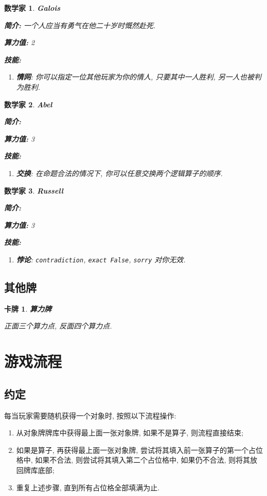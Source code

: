 \documentclass[UTF8]{ctexart}
\DeclareMathOperator{\0}{\mathbf{0}}                    %
\newcommand{\<}{\langle}
\renewcommand{\>}{\rangle}                              %
\newenvironment{xmp_box}{
    \begin{tcolorbox}[enhanced, colback=xmp_purple2, boxrule=0pt, frame hidden,
        borderline west={0.7mm}{0.1mm}{xmp_purple1},breakable]
    }
    {\end{tcolorbox}}
\newenvironment{cxmp_box}{
    \begin{tcolorbox}[enhanced, colback=cxmp_red2, boxrule=0pt, frame hidden,
        borderline west={0.7mm}{0.1mm}{cxmp_red1},breakable]
    }
    {\end{tcolorbox}}
\theoremstyle{MyStyle} %
\newtheorem{example}[definition]{卡牌}
\newenvironment{crd}[1]
{
    \begin{xmp_box}
        \begin{example}
            \textbf{#1}
            \newline
}
{
        \end{example}
    \end{xmp_box}
}
\newtheorem{mathematician}{数学家}
\newenvironment{hero}[3]
{
    \begin{cxmp_box}
        \begin{mathematician}
            \textbf{#1}

            \textbf{简介: }#2
            
            \textbf{算力值: }#3

            \textbf{技能: }
}
{
        \end{mathematician}
    \end{cxmp_box}
}
\newcommand*{\lean}[1]{\texttt{\color{blue}#1}}
\begin{document}
        \begin{hero}
            {Galois}
            {一个人应当有勇气在他二十岁时慨然赴死. }
            {2}
            \begin{enumerate}
                \item \textbf{情网}: 你可以指定一位其他玩家为你的情人, 只要其中一人胜利, 另一人也被判为胜利. 
            \end{enumerate}
        \end{hero}

        \begin{hero}
            {Abel}
            {}
            {3}
            \begin{enumerate}
                \item \textbf{交换}: 在命题合法的情况下, 你可以任意交换两个逻辑算子的顺序. 
            \end{enumerate}
        \end{hero}

        \begin{hero}
            {Russell}
            {}
            {3}
            \begin{enumerate}
                \item \textbf{悖论}: \lean{contradiction}, \lean{exact False}, \texttt{\color{red}sorry} 对你无效. 
            \end{enumerate}
        \end{hero}

    \subsection{其他牌}
        
        \begin{crd}
            {算力牌}
            正面三个算力点, 反面四个算力点. 
        \end{crd}

    \section{游戏流程}

    \subsection{约定}

        每当玩家需要随机获得一个对象时, 按照以下流程操作: 
        \begin{enumerate}
            \item 从对象牌牌库中获得最上面一张对象牌, 如果不是算子, 则流程直接结束; 
            \item 如果是算子, 再获得最上面一张对象牌, 尝试将其填入前一张算子的第一个占位格中, 如果不合法, 则尝试将其填入第二个占位格中, 如果仍不合法, 则将其放回牌库底部; 
            \item 重复上述步骤, 直到所有占位格全部填满为止. 
        \end{enumerate}
\end{document}

